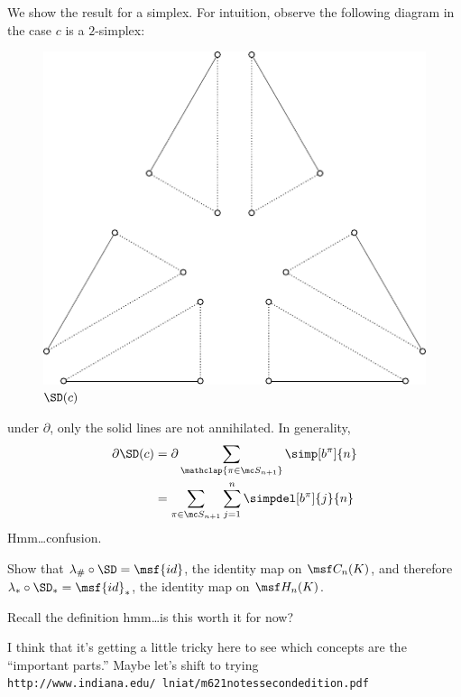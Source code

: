 \begin{solution}
  We show the result for a simplex. For intuition, observe the following
  diagram in the case $c$ is a $2$-simplex:
  \begin{figure}[H]
    \centering
    \includegraphics{figures/offset-barycentric-1.pdf}
    \caption{$\SD(c)$}
  \end{figure}
  under $\partial$, only the solid lines are not annihilated. In generality,
  \begin{align*}
    \partial \SD(c)
    &= \partial\sum_{\mathclap{\pi \in \mc S_{n+1}}} \simp[b^\pi]{n} \\
    &= \sum_{\pi \in \mc S_{n+1}} \sum_{j=1}^n \simpdel[b^\pi]{j}{n}
  \end{align*}
  Hmm\ldots confusion.
\end{solution}
\begin{problem}[16.21]
  Show that $\lambda_\# \circ \SD = \msf{id}$, the identity map on $\msf
  C_n(K)$, and therefore $\lambda_* \circ \SD_* = \msf{id}_*$, the identity map
  on $\msf H_n(K)$.
\end{problem}
\begin{solution}
  Recall the definition {\color{red} hmm\ldots is this worth it for now?}
\end{solution}

\begin{note}
  \color{green} I think that it's getting a little tricky here to see which
  concepts are the ``important parts.'' Maybe let's shift to trying
  \texttt{http://www.indiana.edu/~lniat/m621notessecondedition.pdf}
\end{note}

